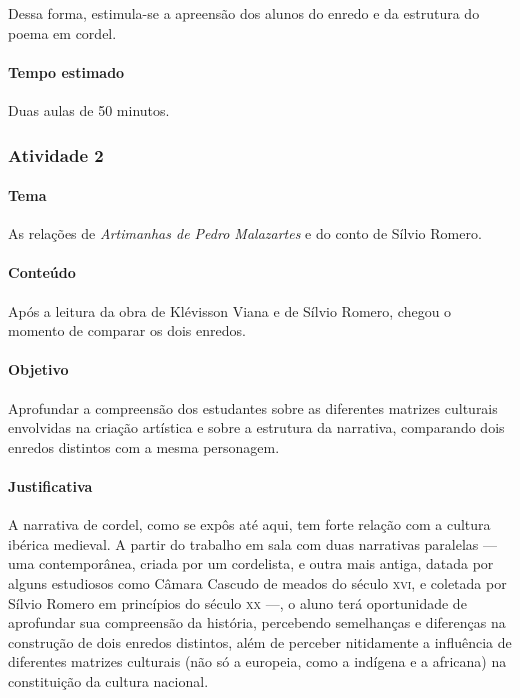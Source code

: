 \documentclass[11pt]{extarticle}
\begin{document}
Dessa forma, estimula-se a apreensão dos alunos do enredo e da estrutura do poema em cordel.

\paragraph{Tempo estimado} Duas aulas de 50 minutos.


\subsubsection{Atividade 2}


\paragraph{Tema} As relações de \textit{Artimanhas de Pedro Malazartes} e do conto de Sílvio Romero.

\paragraph{Conteúdo} Após a leitura da obra de Klévisson Viana e de Sílvio Romero, chegou o momento de comparar os dois enredos.

\paragraph{Objetivo} Aprofundar a compreensão dos estudantes sobre as diferentes matrizes culturais envolvidas na criação artística e sobre a estrutura da narrativa, comparando dois enredos distintos com a mesma personagem.

\paragraph{Justificativa} A narrativa de cordel, como se expôs até aqui, tem forte relação com a cultura ibérica medieval. A partir do trabalho em sala com duas narrativas paralelas --- uma contemporânea, criada por um cordelista, e outra mais antiga, datada por alguns estudiosos como Câmara Cascudo de meados do século \textsc{xvi}, e coletada por Sílvio Romero em princípios do século \textsc{xx} ---, o aluno terá oportunidade de aprofundar sua compreensão da história, percebendo semelhanças e diferenças na construção de dois enredos distintos, além de perceber nitidamente a influência de diferentes matrizes culturais (não só a europeia, como a indígena e a africana) na constituição da cultura nacional.
\end{document}
